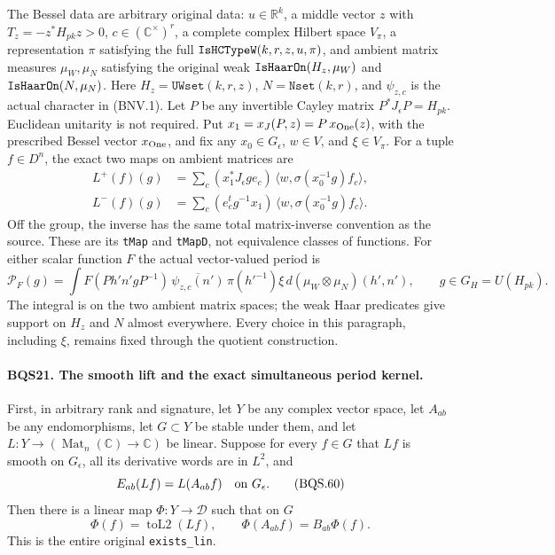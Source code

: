 \documentclass[11pt,a4paper]{article}
\numberwithin{equation}{section}
\theoremstyle{remark}\newtheorem{remark}[theorem]{Remark}
\begin{document}
The Bessel data are arbitrary original data:
$u\in\mathbb R^k$, a middle vector $z$ with $T_z=-z^*H_{pk}z>0$,
$c\in(\mathbb C^\times)^r$, a complete complex Hilbert space $V_\pi$,
a representation $\pi$ satisfying the full
$\texttt{Is\allowbreak HCType\allowbreak W}(k,r,z,u,\pi)$, and ambient matrix measures
$\mu_W,\mu_N$ satisfying the original weak
$\texttt{Is\allowbreak Haar\allowbreak On}(H_z,\mu_W)$ and
$\texttt{Is\allowbreak Haar\allowbreak On}(N,\mu_N)$.
Here $H_z=\texttt{UWset}(k,r,z)$, $N=\texttt{Nset}(k,r)$,
and $\psi_{z,c}$ is the actual character in (BNV.1).
Let $P$ be any invertible Cayley matrix
$P^*J_\epsilon P=H_{pk}$.  Euclidean unitarity is not required.
Put $x_1=x_J(P,z)=P\,x_{\rm One}(z)$, with the prescribed Bessel
vector $x_{\rm One}$, and fix any
$x_0\in G_\epsilon$, $w\in V$, and $\xi\in V_\pi$.
For a tuple $f\in D^n$, the exact two maps on ambient matrices are
\[
 \begin{split}
 L^+(f)(g)&=\sum_c
  (x_1^*J_\epsilon ge_c)\,
       \langle w,\sigma(x_0^{-1}g)f_c\rangle,\\
 L^-(f)(g)&=\sum_c
  (e_c^t g^{-1}x_1)\,
       \langle w,\sigma(x_0^{-1}g)f_c\rangle .
 \end{split}
 \tag{BQS.58}
\]
Off the group, the inverse has the same total matrix-inverse convention
as the source.  These are its \texttt{t\allowbreak Map} and \texttt{t\allowbreak Map\allowbreak D},
not equivalence classes of functions.
For either scalar function $F$ the actual vector-valued period is
\[
 \mathcal P_F(g)=
 \int F(P h' n' gP^{-1})\,
       \overline{\psi_{z,c}(n')}\,\pi(h'^{-1})\xi\,
             d(\mu_W\otimes\mu_N)(h',n'),\qquad g\in G_H=U(H_{pk}).
 \tag{BQS.59}
\]
The integral is on the two ambient matrix spaces; the weak Haar
predicates give support on $H_z$ and $N$ almost everywhere.
Every choice in this paragraph, including $\xi$, remains fixed
through the quotient construction.

\paragraph{BQS21. The smooth lift and the exact simultaneous period kernel.}
\label{claim:BQS21}
First, in arbitrary rank and signature, let $Y$ be any complex vector
space, let $A_{ab}$ be any endomorphisms, let $G\subset Y$ be stable
under them, and let $L:Y\to(\operatorname{Mat}_n(\mathbb C)\to\mathbb C)$
be linear.
Suppose for every $f\in G$ that $Lf$ is smooth on $G_\epsilon$,
all its derivative words are in $L^2$, and
\[
                   E_{ab}(Lf)=L(A_{ab}f)\quad\hbox{on }G_\epsilon.
 \tag{BQS.60}
\]
Then there is a linear map $\Phi:Y\to\mathcal D$ such that on $G$
\[
        \Phi(f)=\operatorname{toL2}(Lf),\qquad
        \Phi(A_{ab}f)=B_{ab}\Phi(f).
 \tag{BQS.61}
\]
This is the entire original \texttt{exists\_\allowbreak lin}.
\end{document}
